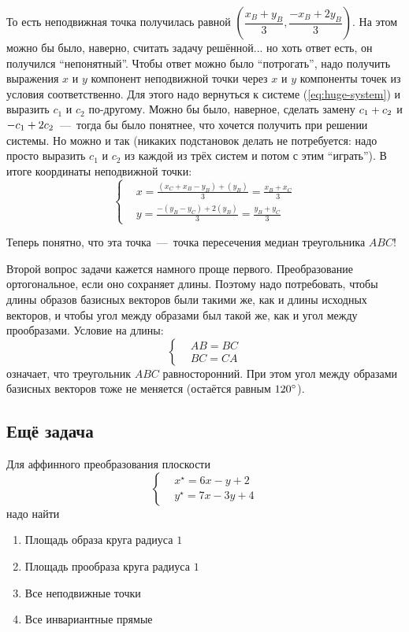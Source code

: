 \documentclass[a4paper,12pt]{article}
\begin{document}
\begin{solution}
    То есть неподвижная точка получилась равной $\left(\dfrac{x_B + y_B}{3}, \dfrac{-x_B + 2y_B}{3}\right)$. На этом можно бы было, наверно, считать задачу решённой... но хоть ответ есть, он получился ``непонятный''.
    Чтобы ответ можно было ``потрогать'', надо получить выражения $x$ и $y$ компонент неподвижной точки через $x$ и $y$ компоненты точек из условия соответственно.
    Для этого надо вернуться к системе (\ref{eq:huge-system}) и выразить $c_1$ и $c_2$ по-другому.
    Можно бы было, наверное, сделать замену $c_1 \hm+ c_2$ и $-c_1 \hm+ 2c_2$~---~тогда бы было понятнее, что хочется получить при решении системы.
    Но можно и так (никаких подстановок делать не потребуется: надо просто выразить $c_1$ и $c_2$ из каждой из трёх систем и потом с этим ``играть'').
    В итоге координаты неподвижной точки:
    \[
      \left\{
        \begin{aligned}
          &x = \frac{(x_C + x_B - y_B) + (y_B)}{3} = \frac{x_B + x_C}{3}\\
          &y = \frac{-(y_B - y_C) + 2(y_B)}{3} = \frac{y_B + y_C}{3}
        \end{aligned}
      \right.
    \]
    
    Теперь понятно, что эта точка~---~точка пересечения медиан треугольника $ABC$!
    
    \bigskip
    
    Второй вопрос задачи кажется намного проще первого.
    Преобразование ортогональное, если оно сохраняет длины.
    Поэтому надо потребовать, чтобы длины образов базисных векторов были такими же, как и длины исходных векторов, и чтобы угол между образами был такой же, как и угол между прообразами.
    Условие на длины:
    \[
      \left\{
        \begin{aligned}
          &AB = BC\\
          &BC = CA
        \end{aligned}
      \right.
    \]
    означает, что треугольник $ABC$ равносторонний.
    При этом угол между образами базисных векторов тоже не меняется (остаётся равным $120\degree$).
  \end{solution}
  
  
  \subsection{Ещё задача}
  
  Для аффинного преобразования плоскости
  \[
    \left\{
      \begin{aligned}
        &x^\star = 6x - y + 2\\
        &y^\star = 7x - 3y + 4
      \end{aligned}
    \right.
  \]
  надо найти
  \begin{enumerate}
    \item Площадь образа круга радиуса $1$
    \item Площадь прообраза круга радиуса $1$
    \item Все неподвижные точки
    \item Все инвариантные прямые
  \end{enumerate}
  
\end{document}
